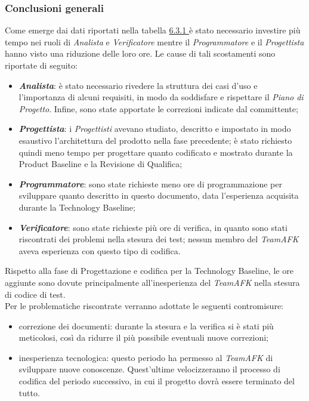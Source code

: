 \subsubsection{Conclusioni generali}
Come emerge dai dati riportati nella tabella \hyperref[tab:pb]{6.3.1 }è stato necessario investire più tempo nei ruoli di \textit{Analista} e \textit{Verificatore} mentre il \textit{Programmatore} e il \textit{Progettista} hanno visto una riduzione delle loro ore. Le cause di tali scostamenti sono riportate di seguito:
\begin{itemize}
	\item \textbf{\textit{Analista}}: è stato necessario rivedere la struttura dei casi d'uso e l'importanza di alcuni requisiti, in modo da soddisfare e rispettare il \textit{Piano di Progetto}. Infine, sono state apportate le correzioni indicate dal committente;
	\item \textbf{\textit{Progettista}}: i \textit{Progettisti} avevano studiato, descritto e impostato in modo esaustivo l'architettura del prodotto nella fase precedente; è stato richiesto quindi meno tempo per progettare quanto codificato e mostrato durante la Product Baseline e la Revisione di Qualifica; 
	\item \textbf{\textit{Programmatore}}: sono state richieste meno ore di programmazione per sviluppare quanto descritto in questo documento, data l'esperienza acquisita durante la Technology Baseline;
	\item \textbf{\textit{Verificatore}}: sono state richieste più ore di verifica, in quanto sono stati riscontrati dei problemi nella stesura dei test; nessun membro del \textit{TeamAFK} aveva esperienza con questo tipo di codifica.
\end{itemize}
Rispetto alla fase di Progettazione e codifica per la Technology Baseline, le ore aggiunte sono dovute principalmente all'inesperienza del \textit{TeamAFK} nella stesura di codice di test. \\
Per le problematiche riscontrate verranno adottate le seguenti contromisure: 
\begin{itemize}
	\item correzione dei documenti: durante la stesura e la verifica si è stati più meticolosi, così da ridurre il più possibile eventuali nuove correzioni;
	\item inesperienza tecnologica: questo periodo ha permesso al \textit{TeamAFK} di sviluppare nuove conoscenze. Quest'ultime velocizzeranno il processo di codifica del periodo successivo, in cui il progetto dovrà essere terminato del tutto.
\end{itemize}


